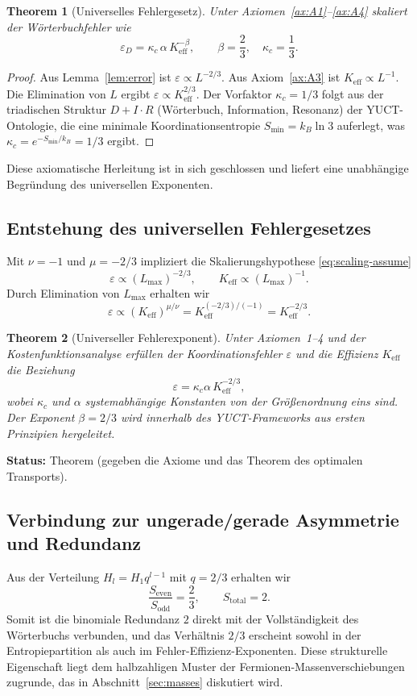 \documentclass[11pt,a4paper]{article}
\newtheorem{theorem}{Theorem}[section]
\begin{document}
	\begin{theorem}[Universelles Fehlergesetz]
		Unter Axiomen~\ref{ax:A1}--\ref{ax:A4} skaliert der Wörterbuchfehler wie
		\[
		\boxed{\varepsilon_D = \kappa_c \, \alpha \, K_{\mathrm{eff}}^{-\beta}, \qquad \beta = \frac{2}{3}, \quad \kappa_c = \frac{1}{3}}.
		\]
	\end{theorem}
	\begin{proof}
		Aus Lemma~\ref{lem:error} ist \(\varepsilon \propto L^{-2/3}\). Aus Axiom~\ref{ax:A3} ist \(K_{\mathrm{eff}} \propto L^{-1}\). Die Elimination von \(L\) ergibt \(\varepsilon \propto K_{\mathrm{eff}}^{2/3}\). Der Vorfaktor \(\kappa_c = 1/3\) folgt aus der triadischen Struktur \(D+I\cdot R\) (Wörterbuch, Information, Resonanz) der YUCT-Ontologie, die eine minimale Koordinationsentropie \(S_{\min} = k_B \ln 3\) auferlegt, was \(\kappa_c = e^{-S_{\min}/k_B} = 1/3\) ergibt.
	\end{proof}
	
	Diese axiomatische Herleitung ist in sich geschlossen und liefert eine unabhängige Begründung des universellen Exponenten.
	
	\subsection{Entstehung des universellen Fehlergesetzes}
	Mit \(\nu = -1\) und \(\mu = -2/3\) impliziert die Skalierungshypothese \eqref{eq:scaling-assume}
	\[
	\varepsilon \propto (L_{\max})^{-2/3}, \qquad K_{\mathrm{eff}} \propto (L_{\max})^{-1}.
	\]
	Durch Elimination von \(L_{\max}\) erhalten wir
	\[
	\varepsilon \propto (K_{\mathrm{eff}})^{\mu/\nu} = K_{\mathrm{eff}}^{(-2/3)/(-1)} = K_{\mathrm{eff}}^{-2/3}.
	\]
	
	\begin{theorem}[Universeller Fehlerexponent]
		Unter Axiomen~1–4 und der Kostenfunktionsanalyse erfüllen der Koordinationsfehler \(\varepsilon\) und die Effizienz \(K_{\mathrm{eff}}\) die Beziehung
		\[
		\boxed{\varepsilon = \kappa_c \alpha \, K_{\mathrm{eff}}^{-2/3}},
		\]
		wobei \(\kappa_c\) und \(\alpha\) systemabhängige Konstanten von der Größenordnung eins sind. Der Exponent \(\beta = 2/3\) wird innerhalb des YUCT-Frameworks aus ersten Prinzipien hergeleitet.
	\end{theorem}
	\textbf{Status:} Theorem (gegeben die Axiome und das Theorem des optimalen Transports).
	
	\subsection{Verbindung zur ungerade/gerade Asymmetrie und Redundanz}
	Aus der Verteilung \(H_l = H_1 q^{l-1}\) mit \(q=2/3\) erhalten wir
	\[
	\frac{S_{\mathrm{even}}}{S_{\mathrm{odd}}} = \frac{2}{3}, \qquad S_{\mathrm{total}} = 2.
	\]
	Somit ist die binomiale Redundanz \(2\) direkt mit der Vollständigkeit des Wörterbuchs verbunden, und das Verhältnis \(2/3\) erscheint sowohl in der Entropiepartition als auch im Fehler-Effizienz-Exponenten. Diese strukturelle Eigenschaft liegt dem halbzahligen Muster der Fermionen-Massenverschiebungen zugrunde, das in Abschnitt~\ref{sec:masses} diskutiert wird.
	
\end{document}

